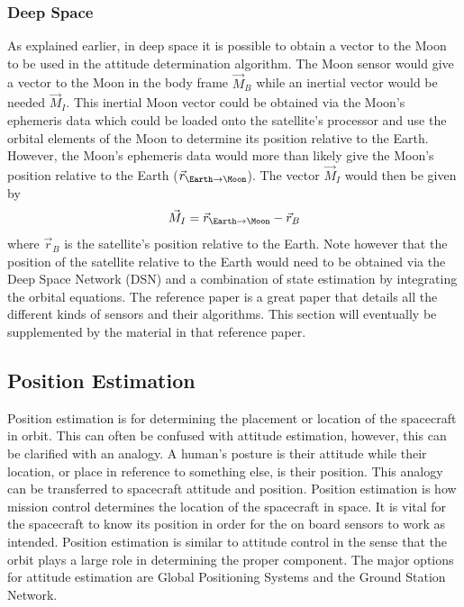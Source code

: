 \subsubsection{Deep Space}

As explained earlier, in deep space it is possible to obtain a vector
to the Moon to be used in the attitude determination algorithm. The
Moon sensor would give a vector to the Moon in the body frame
$\vec{M}_B$ while an inertial vector would be needed $\vec{M}_I$. This
inertial Moon vector could be obtained via the Moon's
ephemeris data which could be loaded onto the satellite's processor
and use the orbital elements of the Moon to determine its position
relative to the Earth. However, the Moon's ephemeris data would more
than likely give the Moon's position relative to the Earth
($\vec{r}_{\Earth \rightarrow \Moon}$). The vector $\vec{M}_I$ would
then be given by
\begin{equation}
  \vec{M}_I = \vec{r}_{\Earth \rightarrow \Moon} - \vec{r}_{B}
\end{equation}
where $\vec{r}_B$ is the satellite's position relative to the
Earth. Note however that the position of the satellite relative to the
Earth would need to be obtained via the Deep Space Network (DSN) and a
combination of state estimation by integrating the orbital
equations. The reference paper \cite{Munoz} is a great paper that
details all the different kinds of sensors and their algorithms. This
section will eventually be supplemented by the material in that
reference paper.

\subsection{Position Estimation}

Position estimation is for determining the placement or location of
the spacecraft in orbit. This can often be confused with attitude
estimation, however, this can be clarified with an analogy. A human's
posture is their attitude while their location, or place in reference
to something else, is their position. This analogy can be transferred
to spacecraft attitude and position. Position estimation is how
mission control determines the location of the spacecraft in space. It
is vital for the spacecraft to know its position in order for the on
board sensors to work as intended. Position estimation is similar to
attitude control in the sense that the orbit plays a large role in
determining the proper component. The major options for attitude
estimation are Global Positioning Systems and the Ground Station
Network. 

